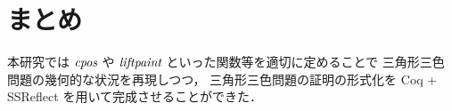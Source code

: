 \section{まとめ}
本研究では $\textit{cpos}$ や $\textit{liftpaint}$ といった関数等を適切に定めることで
三角形三色問題の幾何的な状況を再現しつつ，
三角形三色問題の証明の形式化を Coq + SSReflect を用いて完成させることができた．
